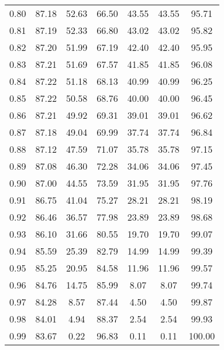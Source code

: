 \begin{tabular}{|c|c|c|c|c|c|c|}
      0.80 &     87.18 &     52.63 &      66.50 &   43.55 &      43.55 &         95.71 \\
      0.81 &     87.19 &     52.33 &      66.80 &   43.02 &      43.02 &         95.82 \\
      0.82 &     87.20 &     51.99 &      67.19 &   42.40 &      42.40 &         95.95 \\
      0.83 &     87.21 &     51.69 &      67.57 &   41.85 &      41.85 &         96.08 \\
      0.84 &     87.22 &     51.18 &      68.13 &   40.99 &      40.99 &         96.25 \\
      0.85 &     87.22 &     50.58 &      68.76 &   40.00 &      40.00 &         96.45 \\
      0.86 &     87.21 &     49.92 &      69.31 &   39.01 &      39.01 &         96.62 \\
      0.87 &     87.18 &     49.04 &      69.99 &   37.74 &      37.74 &         96.84 \\
      0.88 &     87.12 &     47.59 &      71.07 &   35.78 &      35.78 &         97.15 \\
      0.89 &     87.08 &     46.30 &      72.28 &   34.06 &      34.06 &         97.45 \\
      0.90 &     87.00 &     44.55 &      73.59 &   31.95 &      31.95 &         97.76 \\
      0.91 &     86.75 &     41.04 &      75.27 &   28.21 &      28.21 &         98.19 \\
      0.92 &     86.46 &     36.57 &      77.98 &   23.89 &      23.89 &         98.68 \\
      0.93 &     86.10 &     31.66 &      80.55 &   19.70 &      19.70 &         99.07 \\
      0.94 &     85.59 &     25.39 &      82.79 &   14.99 &      14.99 &         99.39 \\
      0.95 &     85.25 &     20.95 &      84.58 &   11.96 &      11.96 &         99.57 \\
      0.96 &     84.76 &     14.75 &      85.99 &    8.07 &       8.07 &         99.74 \\
      0.97 &     84.28 &      8.57 &      87.44 &    4.50 &       4.50 &         99.87 \\
      0.98 &     84.01 &      4.94 &      88.37 &    2.54 &       2.54 &         99.93 \\
      0.99 &     83.67 &      0.22 &      96.83 &    0.11 &       0.11 &        100.00 \\
\bottomrule
\end{tabular}
